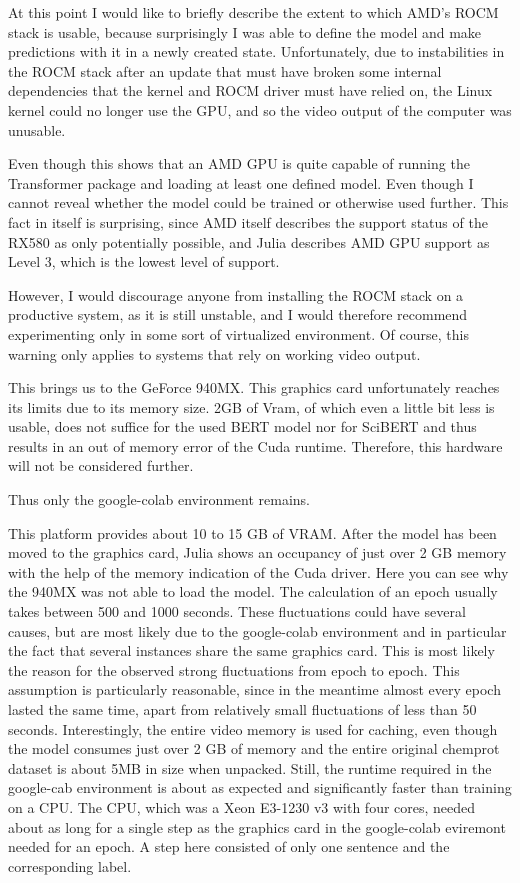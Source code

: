 At this point I would like to briefly describe the extent to which AMD's ROCM stack is usable, because surprisingly I was able to define the model and make predictions with it in a newly created state. Unfortunately, due to instabilities in the ROCM stack after an update that must have broken some internal dependencies that the kernel and ROCM driver must have relied on, the Linux kernel could no longer use the GPU, and so the video output of the computer was unusable.

Even though this shows that an AMD GPU is quite capable of running the Transformer package and loading at least one defined model. Even though I cannot reveal whether the model could be trained or otherwise used further. This fact in itself is surprising, since AMD itself describes the support status of the RX580 as only potentially possible, and Julia describes AMD GPU support as Level 3, which is the lowest level of support.

However, I would discourage anyone from installing the ROCM stack on a productive system, as it is still unstable, and I would therefore recommend experimenting only in some sort of virtualized environment. Of course, this warning only applies to systems that rely on working video output.    

This brings us to the GeForce 940MX. This graphics card unfortunately reaches its limits due to its memory size. 2GB of Vram, of which even a little bit less is usable, does not suffice for the used BERT model nor for SciBERT and thus results in an out of memory error of the Cuda runtime. Therefore, this hardware will not be considered further. 

Thus only the google-colab environment remains. 

This platform provides about 10 to 15 GB of VRAM. After the model has been moved to the graphics card, Julia shows an occupancy of just over 2 GB memory with the help of the memory indication of the Cuda driver. Here you can see why the 940MX was not able to load the model. The calculation of an epoch usually takes between 500 and 1000 seconds. These fluctuations could have several causes, but are most likely due to the google-colab environment and in particular the fact that several instances share the same graphics card. This is most likely the reason for the observed strong fluctuations from epoch to epoch. This assumption is particularly reasonable, since in the meantime almost every epoch lasted the same time, apart from relatively small fluctuations of less than 50 seconds. Interestingly, the entire video memory is used for caching, even though the model consumes just over 2 GB of memory and the entire original chemprot dataset is about 5MB in size when unpacked. Still, the runtime required in the google-cab environment is about as expected and significantly faster than training on a CPU. The CPU, which was a Xeon E3-1230 v3 with four cores, needed about as long for a single step as the graphics card in the google-colab eviremont needed for an epoch. A step here consisted of only one sentence and the corresponding label. 
